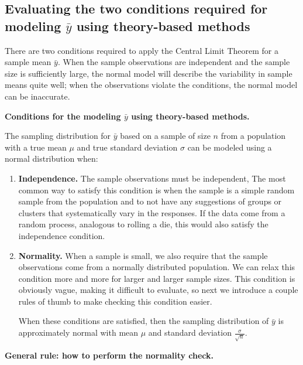 \documentclass[
  10pt,
  openany]{book}
\theoremstyle{definition}
\theoremstyle{definition}
\theoremstyle{definition}
\theoremstyle{definition}
\theoremstyle{remark}
\begin{document}
\subsection{\texorpdfstring{Evaluating the two conditions required for modeling \(\bar{y}\) using theory-based methods}{Evaluating the two conditions required for modeling \textbackslash bar\{y\} using theory-based methods}}\label{evaluating-the-two-conditions-required-for-modeling-bary-using-theory-based-methods}

There are two conditions required to apply the
Central Limit Theorem
for a sample mean \(\bar{y}\).
When the sample observations
are independent and the sample size is sufficiently
large, the normal model will describe the variability in sample means quite well; when the observations violate the conditions, the normal model can be inaccurate.

\textbf{Conditions for the modeling
\(\bar{y}\) using theory-based methods.}

The sampling distribution for \(\bar{y}\) based on
a sample of size \(n\) from a population with a true
mean \(\mu\) and true standard deviation \(\sigma\) can be modeled
using a normal distribution when:

\begin{enumerate}
\def\labelenumi{\arabic{enumi}.}
\item
  \textbf{Independence.} The sample observations must be independent,
  The most common way to satisfy this condition is
  when the sample is a simple random sample from the
  population and to not have any suggestions of groups or clusters that systematically vary in the responses.
  If the data come from a random process,
  analogous to rolling a die,
  this would also satisfy the independence condition.
\item
  \textbf{Normality.} When a sample is small,
  we also require that the sample observations
  come from a normally distributed population.
  We can relax this condition more and more
  for larger and larger sample sizes.
  This condition is obviously vague,
  making it difficult to evaluate,
  so next we introduce a couple rules of thumb
  to make checking this condition easier.

  When these conditions are satisfied, then the sampling
  distribution of \(\bar{y}\) is approximately normal with mean
  \(\mu\) and standard deviation \(\frac{\sigma}{\sqrt{n}}\).
\end{enumerate}

\textbf{General rule: how to perform the normality check.}
\end{document}
